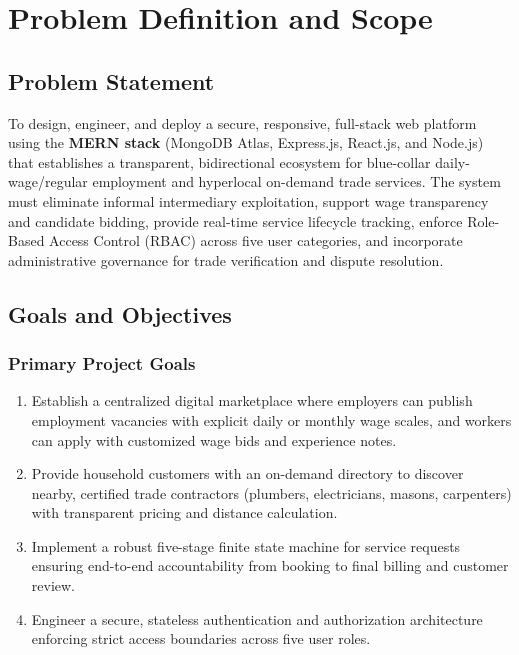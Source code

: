 \newpage
\chapter{Problem Definition and Scope}

\section{Problem Statement}
To design, engineer, and deploy a secure, responsive, full-stack web platform using the \textbf{MERN stack} (MongoDB Atlas, Express.js, React.js, and Node.js) that establishes a transparent, bidirectional ecosystem for blue-collar daily-wage/regular employment and hyperlocal on-demand trade services. The system must eliminate informal intermediary exploitation, support wage transparency and candidate bidding, provide real-time service lifecycle tracking, enforce Role-Based Access Control (RBAC) across five user categories, and incorporate administrative governance for trade verification and dispute resolution.

\section{Goals and Objectives}
\subsection{Primary Project Goals}
\begin{enumerate}
    \item Establish a centralized digital marketplace where employers can publish employment vacancies with explicit daily or monthly wage scales, and workers can apply with customized wage bids and experience notes.
    \item Provide household customers with an on-demand directory to discover nearby, certified trade contractors (plumbers, electricians, masons, carpenters) with transparent pricing and distance calculation.
    \item Implement a robust five-stage finite state machine for service requests ensuring end-to-end accountability from booking to final billing and customer review.
    \item Engineer a secure, stateless authentication and authorization architecture enforcing strict access boundaries across five user roles.
\end{enumerate}


